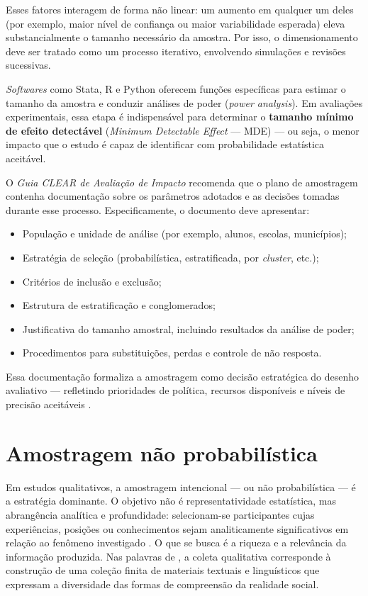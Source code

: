 \documentclass[12pt, a4paper, openany]{book}
\begin{document}
Esses fatores interagem de forma n\~ao linear: um aumento em qualquer um deles (por exemplo, maior n\'ivel de confian\c{c}a ou maior variabilidade esperada) eleva substancialmente o tamanho necess\'ario da amostra. Por isso, o dimensionamento deve ser tratado como um processo iterativo, envolvendo simula\c{c}\~oes e revis\~oes sucessivas.

\textit{Softwares} como Stata, R e Python oferecem fun\c{c}\~oes espec\'ificas para estimar o tamanho da amostra e conduzir an\'alises de poder (\textit{power analysis}). Em avalia\c{c}\~oes experimentais, essa etapa \'e indispens\'avel para determinar o \textbf{tamanho m\'inimo de efeito detect\'avel} (\textit{Minimum Detectable Effect} --- MDE) --- ou seja, o menor impacto que o estudo \'e capaz de identificar com probabilidade estat\'istica aceit\'avel.

O \textit{Guia CLEAR de Avalia\c{c}\~ao de Impacto} \citep{fgvclear2025ai} recomenda que o plano de amostragem contenha documenta\c{c}\~ao sobre os par\^ametros adotados e as decis\~oes tomadas durante esse processo. Especificamente, o documento deve apresentar:

\begin{itemize}
\item Popula\c{c}\~ao e unidade de an\'alise (por exemplo, alunos, escolas, munic\'ipios);
\item Estrat\'egia de sele\c{c}\~ao (probabil\'istica, estratificada, por \textit{cluster}, etc.);
\item Crit\'erios de inclus\~ao e exclus\~ao;
\item Estrutura de estratifica\c{c}\~ao e conglomerados;
\item Justificativa do tamanho amostral, incluindo resultados da an\'alise de poder;
\item Procedimentos para substitui\c{c}\~oes, perdas e controle de n\~ao resposta.
\end{itemize}

Essa documenta\c{c}\~ao formaliza a amostragem como decis\~ao estrat\'egica do desenho avaliativo --- refletindo prioridades de pol\'itica, recursos dispon\'iveis e n\'iveis de precis\~ao aceit\'aveis \citep{fgvclear2025mea,duflo2007using,gertler2018impact}.

\section{Amostragem n\~ao probabil\'istica}

Em estudos qualitativos, a amostragem intencional --- ou n\~ao probabil\'istica --- \'e a estrat\'egia dominante. O objetivo n\~ao \'e representatividade estat\'istica, mas abrang\^encia anal\'itica e profundidade: selecionam-se participantes cujas experi\^encias, posi\c{c}\~oes ou conhecimentos sejam analiticamente significativos em rela\c{c}\~ao ao fen\^omeno investigado \citep{rocha2020teoria}. O que se busca \'e a riqueza e a relev\^ancia da informa\c{c}\~ao produzida. Nas palavras de \citet{bauer2013construcao}, a coleta qualitativa corresponde \`a constru\c{c}\~ao de uma cole\c{c}\~ao finita de materiais textuais e lingu\'isticos que expressam a diversidade das formas de compreens\~ao da realidade social.
\end{document}
